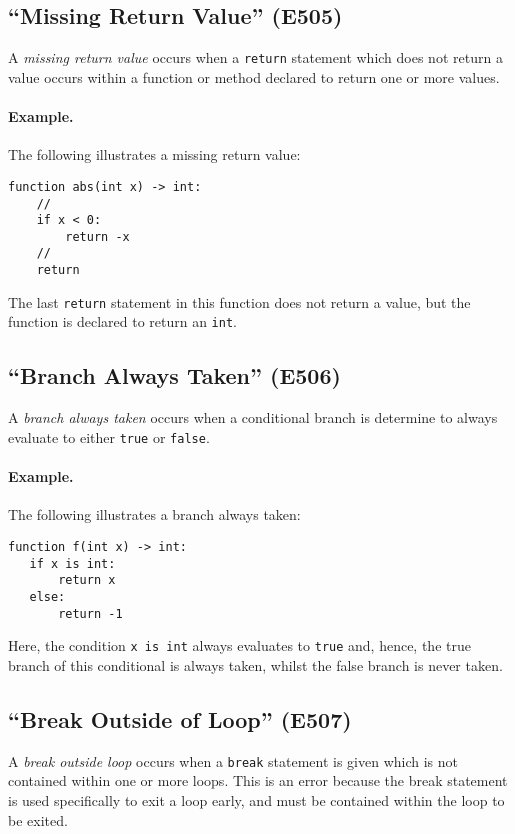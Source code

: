 \subsection{``Missing Return Value'' (E505)}

A {\em missing return value} occurs when a \lstinline{return} statement which does not return a value occurs within a function or method declared to return one or more values.  

\paragraph{Example.} The following illustrates a missing return value:

\begin{lstlisting}
function abs(int x) -> int:
    //
    if x < 0:
        return -x
    //
    return
\end{lstlisting}

The last \lstinline{return} statement in this function does not return a value, but the function is declared to return an \lstinline{int}.

\subsection{``Branch Always Taken'' (E506)}

A {\em branch always taken} occurs when a conditional branch is determine to always evaluate to either \lstinline{true} or \lstinline{false}.  

\paragraph{Example.} The following illustrates a branch always taken:

\begin{lstlisting}
function f(int x) -> int:
   if x is int:
       return x
   else:
       return -1
\end{lstlisting}

Here, the condition \lstinline{x is int} always evaluates to \lstinline{true} and, hence, the true branch of this conditional is always taken, whilst the false branch is never taken.

\subsection{``Break Outside of Loop'' (E507)}

A {\em break outside loop} occurs when a \lstinline{break} statement is given which is not contained within one or more loops.  This is an error because the break statement is used specifically to exit a loop early, and must be contained within the loop to be exited.  

